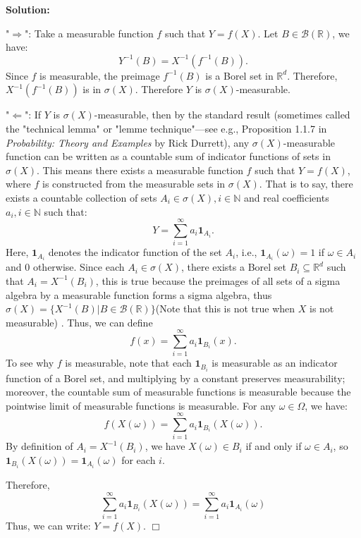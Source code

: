 \documentclass[12pt]{article}
\newenvironment{solution}{\vspace{0.2cm}\color{blue}\textbf{Solution:}}{\hfill\ensuremath{\Box}}
\begin{document}
\begin{solution}

    "$\Rightarrow $":
    Take a measurable function $f$ such that $Y = f(X)$. Let $B\in \mathcal{B}(\mathbb{R})$, we have:
    \[Y^{-1}(B) = X^{-1}(f^{-1}(B)).\]
    Since $f$ is measurable, the preimage $f^{-1}(B)$ is a Borel set in $\mathbb{R}^d$. Therefore, $X^{-1}(f^{-1}(B))$ is in $\sigma(X)$. Therefore $Y$ is $\sigma(X)$-measurable. 
    
    "$\Leftarrow $":
    If $Y$ is $\sigma(X)$-measurable, then by the standard result (sometimes called the "technical lemma" or "lemme technique"—see e.g., Proposition 1.1.7 in \textit{Probability: Theory and Examples} by Rick Durrett), any $\sigma(X)$-measurable function can be written as a countable sum of indicator functions of sets in $\sigma(X)$. This means there exists a measurable function $f$ such that $Y = f(X)$, where $f$ is constructed from the measurable sets in $\sigma(X)$. That is to say, there exists a countable collection of sets $A_i \in \sigma(X), i\in \mathbb{N}$ and real coefficients $a_i, i\in \mathbb{N}$ such that:
    \[Y = \sum_{i=1}^{\infty} a_i \mathbf{1}_{A_i}.\]
    Here, $\mathbf{1}_{A_i}$ denotes the indicator function of the set $A_i$, i.e., $\mathbf{1}_{A_i}(\omega) = 1$ if $\omega \in A_i$ and $0$ otherwise.
    Since each $A_i \in \sigma(X)$, there exists a Borel set $B_i \subseteq \mathbb{R}^d$ such that $A_i = X^{-1}(B_i)$, this is true because the preimages of all sets of a sigma algebra by a measurable function forms a sigma algebra, thus $\sigma(X)=\{X^{-1}(B)|B\in \mathcal{B}(\mathbb{R})\}$(Note that this is not true when $X$ is not measurable) . Thus, we can define
    \[f(x) = \sum_{i=1}^{\infty} a_i \mathbf{1}_{B_i}(x).\]
    To see why $f$ is measurable, note that each $\mathbf{1}_{B_i}$ is measurable as an indicator function of a Borel set, and multiplying by a constant preserves measurability; moreover, the countable sum of measurable functions is measurable because the pointwise limit of measurable functions is measurable.
    For any $\omega \in \Omega$, we have:
    \[f(X(\omega)) = \sum_{i=1}^{\infty} a_i \mathbf{1}_{B_i}(X(\omega)).\]
    By definition of $A_i = X^{-1}(B_i)$, we have $X(\omega) \in B_i$ if and only if $\omega \in A_i$, so $\mathbf{1}_{B_i}(X(\omega)) = \mathbf{1}_{A_i}(\omega)$ for each $i$.

    Therefore,
    \[\sum_{i=1}^{\infty} a_i \mathbf{1}_{B_i}(X(\omega)) = \sum_{i=1}^{\infty} a_i \mathbf{1}_{A_i}(\omega)\]
    Thus, we can write: $Y = f(X)$.
\end{solution}
\end{document}
